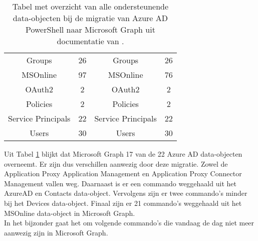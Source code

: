 \begin{table}
\begin{adjustbox}{max width=\textwidth}
\begin{tabular}{ |c|c||c|c| }
        Groups & 26 & Groups & 26 \\ 
        MSOnline & 97 & MSOnline & 76 \\
        OAuth2 & 2 & OAuth2 & 2 \\ 
        Policies & 2 & Policies & 2 \\ 
        Service Principals & 22 & Service Principals & 22 \\ 
        Users & 30 & Users & 30 \\ 
        \hline
    \end{tabular}
    \end{adjustbox}
    \caption[Tabel migratie Azure AD data-objecten naar Microsoft Graph]{Tabel met overzicht van alle ondersteunende data-objecten bij de migratie van Azure \ac{AD} PowerShell naar Microsoft Graph uit documentatie van \textcite{Microsoft2023l}.}
    \label{AADMSG}
\end{table}

Uit Tabel \ref{AADMSG} blijkt dat Microsoft Graph 17 van de 22 Azure \ac{AD} data-objecten overneemt. Er zijn dus verschillen aanwezig door deze migratie. Zowel de Application Proxy Application Management en Application Proxy Connector Management vallen weg. Daarnaast is er een commando weggehaald uit het AzureAD en Contacts data-object. Vervolgens zijn er twee commando's minder bij het Devices data-object. Finaal zijn er 21 commando's weggehaald uit het MSOnline data-object in Microsoft Graph. \\

In het bijzonder gaat het om volgende commando's die vandaag de dag niet meer aanwezig zijn in Microsoft Graph.

